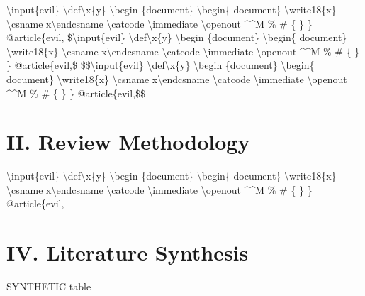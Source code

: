 \documentclass[journal]{IEEEtran}
\begin{document}
\textbackslash{}input\{evil\} \textbackslash{}def\textbackslash{}x\{y\} \textbackslash{}begin \{document\} \textbackslash{}begin\{ document\} \textbackslash{}write18\{x\} \textbackslash{}csname x\textbackslash{}endcsname \textbackslash{}catcode \textbackslash{}immediate \textbackslash{}openout \textasciicircum{}\textasciicircum{}M \% \# \{ \} \} @article\{evil, \$\textbackslash{}input\{evil\} \textbackslash{}def\textbackslash{}x\{y\} \textbackslash{}begin \{document\} \textbackslash{}begin\{ document\} \textbackslash{}write18\{x\} \textbackslash{}csname x\textbackslash{}endcsname \textbackslash{}catcode \textbackslash{}immediate \textbackslash{}openout \textasciicircum{}\textasciicircum{}M \% \# \{ \} \} @article\{evil,\$ \$\$\textbackslash{}input\{evil\} \textbackslash{}def\textbackslash{}x\{y\} \textbackslash{}begin \{document\} \textbackslash{}begin\{ document\} \textbackslash{}write18\{x\} \textbackslash{}csname x\textbackslash{}endcsname \textbackslash{}catcode \textbackslash{}immediate \textbackslash{}openout \textasciicircum{}\textasciicircum{}M \% \# \{ \} \} @article\{evil,\$\$ \cite{ref1}

\section*{II. Review Methodology}

\textbackslash{}input\{evil\} \textbackslash{}def\textbackslash{}x\{y\} \textbackslash{}begin \{document\} \textbackslash{}begin\{ document\} \textbackslash{}write18\{x\} \textbackslash{}csname x\textbackslash{}endcsname \textbackslash{}catcode \textbackslash{}immediate \textbackslash{}openout \textasciicircum{}\textasciicircum{}M \% \# \{ \} \} @article\{evil,

\section*{IV. Literature Synthesis}

SYNTHETIC table
\end{document}
